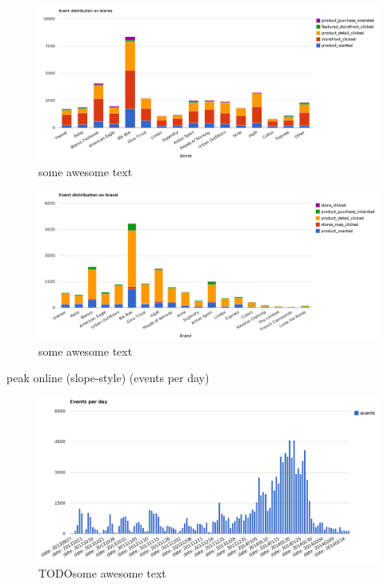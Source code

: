 \begin{figure}[H]
    \includegraphics[width=5in]{image/event_distr.png}
    \centering
    \caption[Distribution of events on storefronts]{some awesome text}
\end{figure}

\begin{figure}[H]
    \includegraphics[width=5in]{image/brand_distr.png}
    \centering
    \caption[Distribution of events on brands]{some awesome text}
\end{figure}

        peak online (slope-style) (events per day)

\begin{figure}[H]
    \includegraphics[width=5in]{image/events_per_day.png}
    \centering
    \caption[Distribution of events per day]{TODOsome awesome text}
\end{figure}


